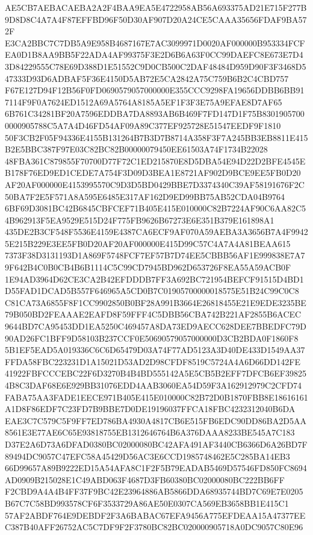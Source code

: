\documentclass[UTF8,fontset=fandol,zihao=-4,a4paper]{ctexart}
\begin{document}
{{AE5CB7AEBACAEBA2A2F4BAA9EA5E4722958AB56A693375AD21E715F277B9D8D8C4A7A4F87EFFBD96F50D30AF907D20A24CE5CAAA35656FDAF9BA572F
E3CA2BBC7C7DB5A9E958B4687167E7AC3099971D0020AF000000B953334FCFEA0D1B8AA9BB5F22ADA4AF99375F3E2D6B6A63F0CC99DAEFC8E673E7D4
3D84229555C78E69D388D1E51552C9D0CB500C2DAF48484D959D90F3F3468D547333D93D6ADBAF5F36E4150D5AB72E5CA2842A75C759B6B2C4CBD757
F67E127D94F12B56F0FD0690579057000000E355CCC9298FA19656DDBB6BB917114F9F0A7624ED1512A69A5764A8185A5EF1F3F3E75A9EFAE8D7AF65
6B761C34281BF20A7596EDDBA7DA8893AB6B469F7FD147D1F75B83019057000000905788C5A7A4D46FD54AF09A89C377EF925728E51547EEDF9F1810
50F3CB2F05F94336E4155B131264B7B3D7B8714A358F3F7A245BB3EB8811E415B2E5BBC387F97E03C82BC82B00000079450EE61503A74F1734B22028
48FBA361C879855F70700D77F72C1ED215870E8D5DBA54E94D22D2BFE4545EB178F76ED9ED1CEDE7A754F3D09D3BEA1E8721AF902D9BCE9EE5FB0D20
AF20AF000000E4153995570C9D3D5BD0429BBE7D3374340C39AF58191676F2C50BA7F2E5F571A8A595E6485E317AF162D9ED99BB75AB52CDA04B9764
6BF69D3081BC42B6845CBFCEF71B405E415E010000C82B7224AF90C6AA82C54B962913F5EA9529E515D24F775FB9626B67273E6E351B379E161898A1
435DE2B3CF548F5536E4159E4387CA6ECF9AF070A59AEBA3A3656B7A4F99425E215B229E3EE5FB0D20AF20AF000000E415D99C57C4A7A4A81BEAA615
7373F38D3131193D1A869F5748FCF7EF57B7D74EE5CBBB56AF1E999838E7A79F642B4C0B0CB4B6B1114C5C99CD7945BD962D653726F8EA55A59ACB0F
1E94AD3964D62CE3CA2B42EFDDDB7FF3A692BC721954BEFCF91515D4BD1D55FAD1DCAD5B557F646965A5CD0B7C01905700000018575E51B24C99C0C8
C81CA73A6855F8F1CC9902850B0BF28A991B3664E26818455E21E9EDE3235BE79B050BD2FEAAAE2EAFD8F59FFF4C5DBB56CBA742B221AF2855B6ACEC
9644BD7CA95453DD1EA5250C469457A8DA73ED9AECC628DEE7BBEDFC79D90AD26FC1BFF9D58103B237CCF0E50690579057000000D3CB2BDA0F1860F8
5B1EF5EAD5A019336C6C6D65479D03A74F77AD5123A3D40DE433D1549AA37FFDA58FBC223231D1A15021D53AD2D98CFDF8519C5724A4A6D66DD142FE
41922FBFCCCEBC22F6D3270B4B4BD555142A5E5CB5B2EFF7DFCB6EF398254B8C3DAF68E6E929BB31076EDD4AAB3060EA54D59F3A162912979C2CFD74
FABA75AA3FADE1EECE971B405E415E010000C82B72D0B1870FBB8E18616161A1D8F86EDF7C23FD7B9BBE7D0DE19196037FFCA18FBC4232312040B6DA
EAE3C7C579C5F9FF7ED786BA4930A4817CB6E515FB6EDC90DD86BA2D5AA8561E3E77AE6C65E93818755EB1312646764B6A376DAAA8233BE545A7C183
D37E2A6D73A6DFAD0380BC02000080BC42AFA491AF3440CB6366D6A26BD7F89494DC9057C47EFC58A45429D56AC3E6CCD1985748462E5C285BA14EB3
66D99657A89B9222ED15A54AFA8C1F2F5B79EADAB5469D57546FD850FC8694AD0909B215028E1C49ABD063F4687D3FB60380BC02000080BC222BB6FF
F2CBD9A4A4B4FF37F9BC42E23964886AB5866DDA68935744BD7C69E7E0205B67C7C58BD993578CF6F3533729A86AE50E0307CA569EB3658BB1E415C1
57AF2ABDF764E9DEBDF2F3A6BABAC67EFA9456A775EFDEAA15A47377EEC387B40AFF26752AC5C7DF9F2F3780BC82BC020000905718A0DC9057C80E96
}}
\end{document}
